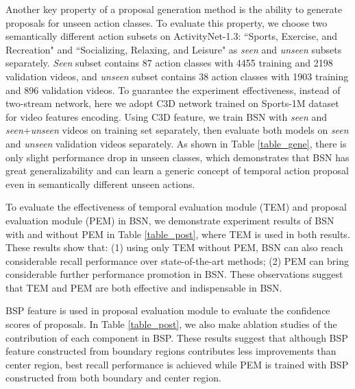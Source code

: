 \documentclass[runningheads]{llncs}
\begin{document}
 Another key property of a proposal generation method  is the ability to generate proposals for unseen action classes.
%
To evaluate this property, we choose two  semantically different action subsets on ActivityNet-1.3: ``Sports, Exercise, and Recreation" and ``Socializing, Relaxing, and Leisure" as \emph{seen} and \emph{unseen} subsets separately. \emph{Seen} subset contains 87 action classes with 4455  training and 2198 validation videos, and \emph{unseen} subset contains 38 action classes with 1903  training and 896 validation videos.
%
To guarantee the experiment effectiveness, instead of two-stream network, here we adopt C3D network \cite{tran2017convnet} trained on Sports-1M dataset \cite{sports1m} for video features encoding. Using C3D feature, we train BSN with \emph{seen} and \emph{seen}+\emph{unseen} videos on training set separately, then evaluate both models on \emph{seen} and \emph{unseen} validation videos separately.
%
As shown in Table \ref{table_gene},  there is only slight performance drop in unseen classes, which demonstrates that BSN  has great generalizability and can learn a generic concept of temporal action proposal even in semantically different unseen actions.

To evaluate the effectiveness of  temporal evaluation module (TEM) and proposal evaluation module (PEM) in BSN, we demonstrate experiment results of BSN with and without PEM in Table \ref{table_post}, where TEM is used in both results. These results show that: (1) using only TEM without PEM, BSN can also reach considerable recall performance over  state-of-the-art methods; (2) PEM can bring considerable further  performance promotion in BSN. These observations suggest that TEM and PEM are both effective and indispensable in BSN.

BSP feature is used in proposal evaluation module to evaluate the confidence scores of proposals. In Table \ref{table_post}, we also make ablation studies of the contribution of each component in BSP.  These results suggest that although BSP feature constructed from   boundary regions contributes less improvements than  center region, best recall performance is achieved while PEM is trained with BSP constructed from both boundary and center region.





\vspace{-0.25cm}
\end{document}
